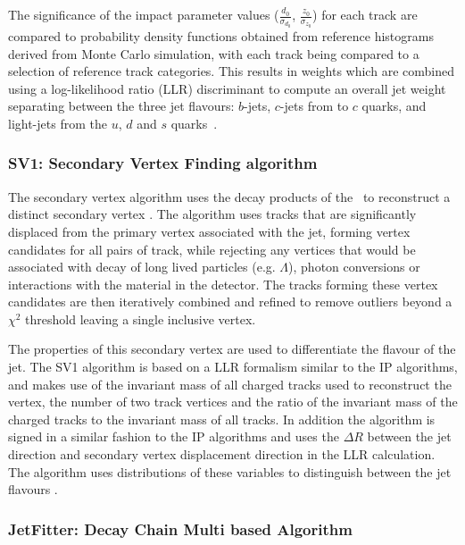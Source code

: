 		The significance of the impact parameter values ($\frac{d_0}{\sigma_{d_0}}$, $\frac{z_0}{\sigma_{z_0}}$) for each track are compared to probability density functions obtained from reference histograms derived from Monte Carlo simulation, with each track being compared to a selection of reference track categories. This results in weights which are combined using a log-likelihood ratio (LLR) discriminant to compute an overall jet weight separating between the three jet flavours: $b$-jets, $c$-jets from to $c$ quarks, and light-jets from the $u$, $d$ and $s$ quarks~\cite{btagOptimisation, bTagPerformance}.

	\newpage
	\subsubsection{SV1: Secondary Vertex Finding algorithm}
	\label{det:btag:sv}

		The secondary vertex algorithm uses the decay products of the \bhadron\ to reconstruct a distinct secondary vertex \cite{IP3D}. The algorithm uses tracks that are significantly displaced from the primary vertex associated with the jet, forming vertex candidates for all pairs of track, while rejecting any vertices that would be associated with decay of long lived particles (e.g. $\Lambda$), photon conversions or interactions with the material in the detector. The tracks forming these vertex candidates are then iteratively combined and refined to remove outliers beyond a $\chi^2$ threshold leaving a single inclusive vertex.

		The properties of this secondary vertex are used to differentiate the flavour of the jet. The SV1 algorithm is based on a LLR formalism similar to the IP algorithms, and makes use of the invariant mass of all charged tracks used to reconstruct the vertex, the number of two track vertices and the ratio of the invariant mass of the charged tracks to the invariant mass of all tracks. In addition the algorithm is signed in a similar fashion to the IP algorithms and uses the $\Delta R$ between the jet direction and secondary vertex displacement direction in the LLR calculation. The algorithm uses distributions of these variables to distinguish between the jet flavours \cite{btagOptimisation, bTagPerformance}.

	\subsubsection{JetFitter: Decay Chain Multi based Algorithm}
	\label{det:btag:jf}

